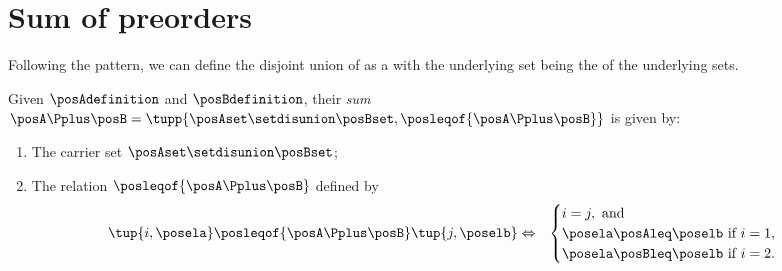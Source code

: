 
\section{Sum of preorders}

Following the pattern, we can define the disjoint union of  as a  with the underlying set being the  of the underlying sets.
\begin{ctdefinition}
    \label{def:disjoint-union-of-posets}
    Given  $\posAdefinition$ and $\posBdefinition$, their \emph{sum} $\posA\Pplus\posB=\tupp{\posAset \setdisunion \posBset, {{\posleqof{\posA \Pplus \posB}}}}$ is given by:

    \constit
    \begin{enumerate}
        \item The carrier set $\posAset \setdisunion \posBset$;
        \item The relation $\posleqof{\posA \Pplus \posB}$ defined by
              \begin{equation} \label{eq:poset-disunion}
                  \begin{aligned}
                      \tup{i, \posela} \posleqof{\posA\Pplus\posB}  \tup{ j, \poselb}
                       & \Leftrightarrow &
                      \begin{cases}
                          i = j, \text{ and}                            \\
                          \posela \posAleq \poselb \text{ if } i = 1, \\
                          \posela \posBleq \poselb \text{ if } i = 2.
                      \end{cases}
                  \end{aligned}
              \end{equation}
    \end{enumerate}
\end{ctdefinition}

